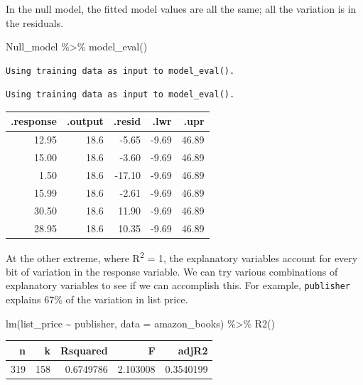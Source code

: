 \documentclass[
  letterpaper,
  DIV=11,
  numbers=noendperiod,
  oneside]{scrreprt}
\newenvironment{Shaded}{\begin{snugshade}}{\end{snugshade}}
\newcommand{\AttributeTok}[1]{\textcolor[rgb]{0.40,0.45,0.13}{#1}}
\newcommand{\FunctionTok}[1]{\textcolor[rgb]{0.28,0.35,0.67}{#1}}
\newcommand{\NormalTok}[1]{\textcolor[rgb]{0.00,0.23,0.31}{#1}}
\newcommand{\SpecialCharTok}[1]{\textcolor[rgb]{0.37,0.37,0.37}{#1}}
\begin{document}
In the null model, the fitted model values are all the same; all the
variation is in the residuals.

\begin{Shaded}
\begin{Highlighting}[]
\NormalTok{Null\_model }\SpecialCharTok{\%\textgreater{}\%} \FunctionTok{model\_eval}\NormalTok{()}
\end{Highlighting}
\end{Shaded}

\begin{verbatim}
Using training data as input to model_eval().
\end{verbatim}

\begin{verbatim}
Using training data as input to model_eval().
\end{verbatim}

\begin{tabular}{r|r|r|r|r}
\hline
.response & .output & .resid & .lwr & .upr\\
\hline
12.95 & 18.6 & -5.65 & -9.69 & 46.89\\
\hline
15.00 & 18.6 & -3.60 & -9.69 & 46.89\\
\hline
1.50 & 18.6 & -17.10 & -9.69 & 46.89\\
\hline
15.99 & 18.6 & -2.61 & -9.69 & 46.89\\
\hline
30.50 & 18.6 & 11.90 & -9.69 & 46.89\\
\hline
28.95 & 18.6 & 10.35 & -9.69 & 46.89\\
\hline
\end{tabular}

At the other extreme, where R\textsuperscript{2} = 1, the explanatory
variables account for every bit of variation in the response variable.
We can try various combinations of explanatory variables to see if we
can accomplish this. For example, \texttt{publisher} explains 67\% of
the variation in list price.

\begin{Shaded}
\begin{Highlighting}[]
\FunctionTok{lm}\NormalTok{(list\_price }\SpecialCharTok{\textasciitilde{}}\NormalTok{ publisher, }\AttributeTok{data =}\NormalTok{ amazon\_books) }\SpecialCharTok{\%\textgreater{}\%} \FunctionTok{R2}\NormalTok{()}
\end{Highlighting}
\end{Shaded}

\ttfamily 
\begin{tabular}{rrrrr}
\toprule
n & k & Rsquared & F & adjR2\\
\midrule
319 & 158 & 0.6749786 & 2.103008 & 0.3540199\\
\bottomrule
\end{tabular} \normalfont
\bigskip
\end{document}
